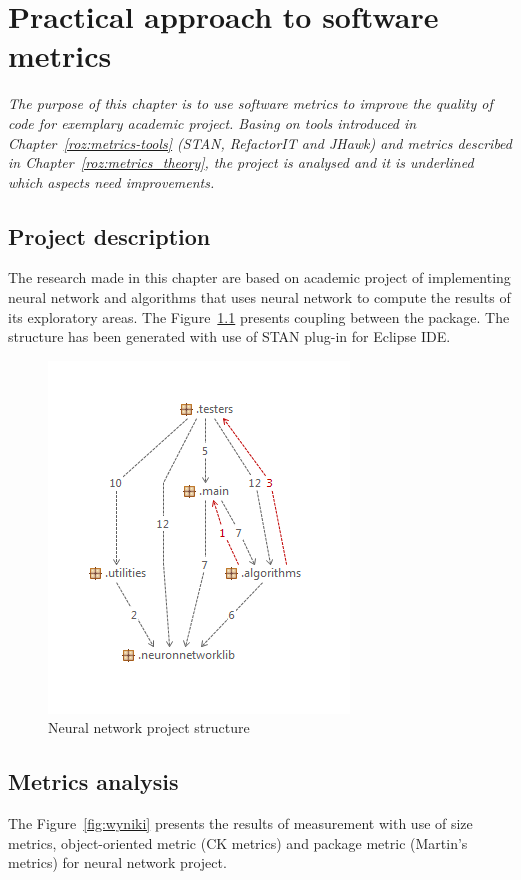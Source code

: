 \chapter{Practical approach to software metrics} \label{roz:metrics-practic}

\textit{The purpose of this chapter is to use software metrics to improve the quality of code for exemplary academic project. Basing on tools introduced in Chapter~\ref{roz:metrics-tools} (STAN, RefactorIT and JHawk) and metrics described in Chapter~\ref{roz:metrics_theory}, the project is analysed and it is underlined which aspects need improvements.}

\section{Project description}
The research made in this chapter are based on academic project of implementing neural network and algorithms that uses neural network to compute the results of its exploratory areas. The Figure~\ref{fig:structureneural} presents coupling between the package. The structure has been generated with use of STAN plug-in for Eclipse \ac{IDE}. 

\begin{figure}[h!]
 	\centering
 	\includegraphics[scale=1]{img/str.png} 
 	\caption{Neural network project structure}		
 	\label{fig:structureneural}
 \end{figure} 

\section{Metrics analysis}
The Figure~\ref{fig:wyniki} presents the results of measurement with use of size metrics, object-oriented metric (\ac{CK metrics}) and package metric (Martin's metrics) for neural network project.  

